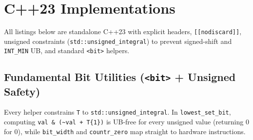 \documentclass[11pt,a4paper]{article}
\theoremstyle{definition}
\begin{document}
\section{C++23 Implementations}

All listings below are standalone C++23 with explicit headers, \texttt{[[nodiscard]]}, unsigned constraints (\texttt{std::unsigned\_integral}) to prevent signed-shift and \texttt{INT\_MIN} UB, and standard \texttt{<bit>} helpers.

\subsection{Fundamental Bit Utilities (\texttt{<bit>} + Unsigned Safety)}

Every helper constrains \texttt{T} to \texttt{std::unsigned\_integral}. In \texttt{lowest\_set\_bit}, computing \texttt{val \& (\textasciitilde val + T\{1\})} is UB-free for every unsigned value (returning $0$ for $0$), while \texttt{bit\_width} and \texttt{countr\_zero} map straight to hardware instructions.
\end{document}

